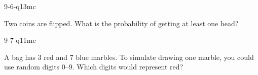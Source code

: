 \begin{practiceQuestion}{9-6-q13}{mc}
\begin{questionText}
Two coins are flipped. What is the probability of getting at least one head?
\end{questionText}
\end{practiceQuestion}

\begin{practiceQuestion}{9-7-q11}{mc}
\begin{questionText}
A bag has $3$ red and $7$ blue marbles. To simulate drawing one marble, you could use random digits $0$--$9$. Which digits would represent red?
\end{questionText}
\end{practiceQuestion}

